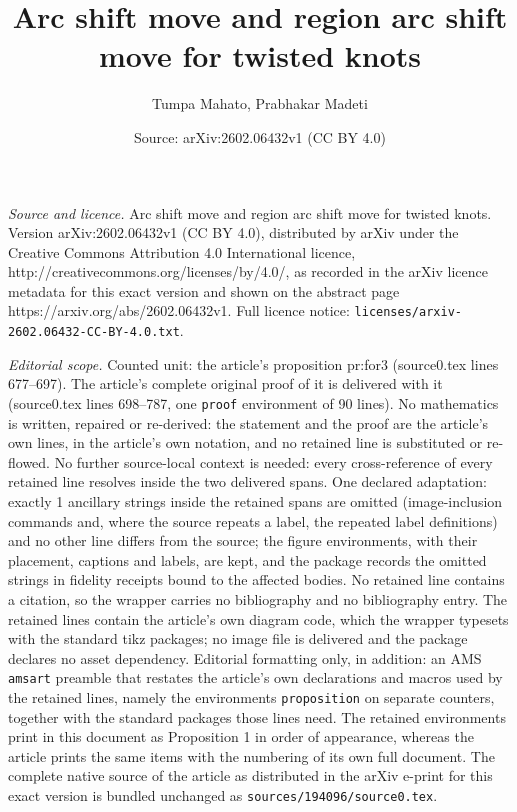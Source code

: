\documentclass[10pt,a4paper]{amsart}
\title{Arc shift move and region arc shift move for twisted knots}
\author{Tumpa Mahato, Prabhakar Madeti}
\date{Source: arXiv:2602.06432v1 (CC BY 4.0)}
\begin{document}
\maketitle

\noindent\emph{Source and licence.} Arc shift move and region arc shift move for twisted knots. Version arXiv:2602.06432v1 (CC BY 4.0), distributed by arXiv under the Creative Commons Attribution 4.0 International licence, http://creativecommons.org/licenses/by/4.0/, as recorded in the arXiv licence metadata for this exact version and shown on the abstract page https://arxiv.org/abs/2602.06432v1. Full licence notice: \texttt{licenses/arxiv-2602.06432-CC-BY-4.0.txt}.\par\smallskip

\noindent\textit{Editorial scope.} Counted unit: the article's proposition pr:for3 (source0.tex lines 677--697). The article's complete original proof of it is delivered with it (source0.tex lines 698--787, one \texttt{proof} environment of 90 lines). No mathematics is written, repaired or re-derived: the statement and the proof are the article's own lines, in the article's own notation, and no retained line is substituted or re-flowed.  No further source-local context is needed: every cross-reference of every retained line resolves inside the two delivered spans.  One declared adaptation: exactly 1 ancillary strings inside the retained spans are omitted (image-inclusion commands and, where the source repeats a label, the repeated label definitions) and no other line differs from the source; the figure environments, with their placement, captions and labels, are kept, and the package records the omitted strings in fidelity receipts bound to the affected bodies.  No retained line contains a citation, so the wrapper carries no bibliography and no bibliography entry.  The retained lines contain the article's own diagram code, which the wrapper typesets with the standard tikz packages; no image file is delivered and the package declares no asset dependency.  Editorial formatting only, in addition: an AMS \texttt{amsart} preamble that restates the article's own declarations and macros used by the retained lines, namely the environments \texttt{proposition} on separate counters, together with the standard packages those lines need.  The retained environments print in this document as Proposition 1 in order of appearance, whereas the article prints the same items with the numbering of its own full document.  The complete native source of the article as distributed in the arXiv e-print for this exact version is bundled unchanged as \texttt{sources/194096/source0.tex}.
\end{document}
